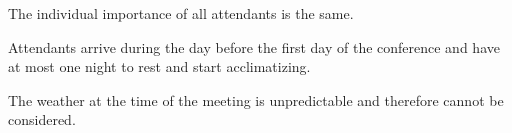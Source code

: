 \begin{assumption}
The individual importance of all attendants is the same.
\end{assumption}

\begin{assumption}
Attendants arrive during the day before the first day of the conference and have at most one night to rest and start acclimatizing.
\end{assumption}

\begin{assumption}
The weather at the time of the meeting is unpredictable and therefore cannot be considered.
\end{assumption}


